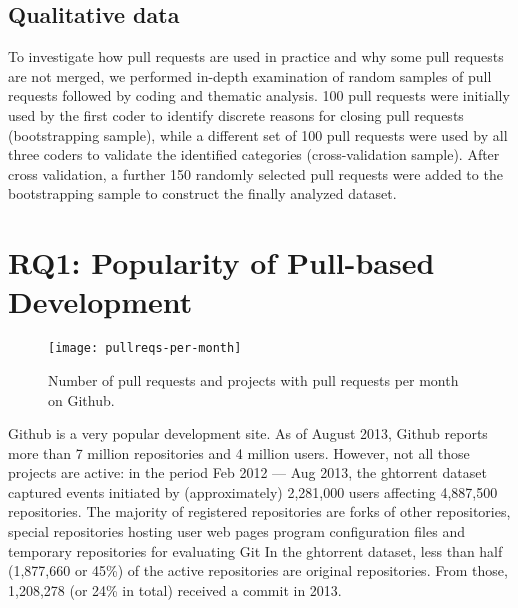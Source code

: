 \documentclass{sig-alternate}
\begin{document}
\subsection{Qualitative data}
\label{sec:qualitative}
To investigate how pull requests are used in practice and why some pull requests
are not merged, we performed in-depth examination of random samples of pull
requests followed by coding and thematic analysis. 100 pull requests were initially
used by the first coder to identify discrete reasons for closing pull requests
(bootstrapping sample), while a different set of 100 pull requests were used by
all three coders to validate the identified categories (cross-validation
sample). After cross validation, a further 150 randomly selected pull requests
were added to the bootstrapping sample to construct the finally analyzed
dataset.


\section{RQ1: Popularity of Pull-based Development}
\label{sec:github}
%

\begin{figure}[t]
  \centering
\texttt{[image: pullreqs-per-month]}
\label{fig:pullreq-per-month}
\caption{Number of pull requests and projects with pull requests per month on
Github.}
\end{figure}

Github is a very popular development site. As of August 2013, Github reports
more than 7 million repositories and 4 million users. However, not all those
projects are active: in the period Feb 2012 --- Aug 2013, the {\sc ght}orrent dataset captured events initiated by
(approximately) 2,281,000 users affecting 4,887,500 repositories. The majority
of registered repositories are forks of other repositories, special repositories
hosting user web pages 
program
configuration files 
and temporary repositories for evaluating Git 
In the {\sc ght}orrent dataset, less than half
(1,877,660 or 45\%) of the active repositories are original repositories. From
those, 1,208,278 (or 24\% in total) received a commit in 2013.
\end{document}
